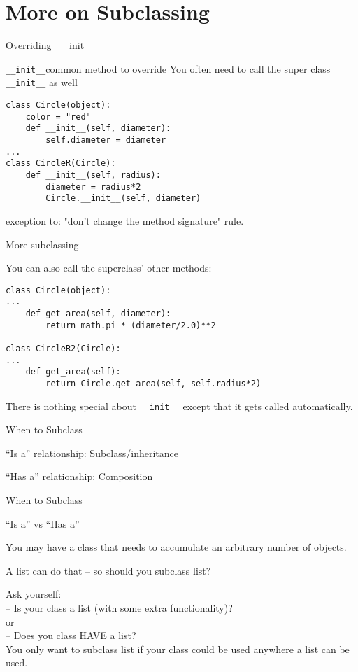 \documentclass{beamer}
\begin{document}
\section{More on Subclassing}

\begin{frame}[fragile]{Overriding \_\_init\_\_}

{\Large \verb|__init__|common method to override}
\vfill
{\large You often need to call the super class \verb|__init__| as well}
\vfill
\begin{verbatim}
class Circle(object):
    color = "red"
    def __init__(self, diameter):
        self.diameter = diameter
...
class CircleR(Circle):
    def __init__(self, radius):
        diameter = radius*2
        Circle.__init__(self, diameter)
\end{verbatim}
\vfill
exception to: "don't change the method signature" rule.
\end{frame} 

\begin{frame}[fragile]{More subclassing}

{\large You can also call the superclass' other methods:}
\vfill
\begin{verbatim}
class Circle(object):
...
    def get_area(self, diameter):
        return math.pi * (diameter/2.0)**2

class CircleR2(Circle):
...
    def get_area(self):
        return Circle.get_area(self, self.radius*2)
\end{verbatim}

\vfill
There is nothing special about \verb|__init__| except that it gets called automatically.
\end{frame} 


\begin{frame}[fragile]{When to Subclass}

\vfill
{\Large ``Is a'' relationship: Subclass/inheritance}

\vfill
{\Large ``Has a'' relationship: Composition}
\end{frame}

\begin{frame}[fragile]{When to Subclass}

{\Large ``Is a'' vs ``Has a'' }

\vfill
You may have a class that needs to accumulate an arbitrary number of objects.

\vfill
A list can do that -- so should you subclass list?

\vfill
Ask yourself:\\

\vfill
-- Is your class a list (with some extra functionality)?\\
\hspace{0.4in}or\\
-- Does you class HAVE a list?\\

\vfill
You only want to subclass list if your class could be used anywhere a list can be used.
\end{frame}
\end{document}
